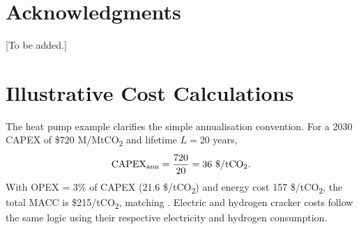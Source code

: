 \documentclass[12pt,a4paper]{article}
\begin{document}
\section*{Acknowledgments}

[To be added.]




\appendix

\section{Illustrative Cost Calculations}
\label{app:cost}

The heat pump example clarifies the simple annualisation convention. For a 2030 CAPEX of \$720 M/MtCO\textsubscript{2} and lifetime $L=20$ years,
\begin{equation}
\mathrm{CAPEX}_{\mathrm{ann}} = \frac{720}{20} = 36 \text{ \$/tCO\textsubscript{2}}.
\end{equation}
With OPEX = 3\% of CAPEX (21.6 \$/tCO\textsubscript{2}) and energy cost 157 \$/tCO\textsubscript{2}, the total MACC is \$215/tCO\textsubscript{2}, matching . Electric and hydrogen cracker costs follow the same logic using their respective electricity and hydrogen consumption.
\end{document}

